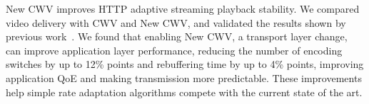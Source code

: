\documentclass[10pt,sigconf]{acmart}
\begin{document}
New CWV improves HTTP adaptive streaming playback stability. We compared video delivery with CWV and New CWV, and validated the results shown by previous work~\cite{Nazir-2014-performance-evaluation-congestion-window-validation-dash-newcwv}. We found that enabling New CWV, a transport layer change, can improve application layer performance, reducing the number of encoding switches by up to 12\% points and rebuffering time by up to 4\% points, improving application QoE and making transmission more predictable. These improvements help simple rate adaptation algorithms compete with the current state of the art.  








\ifpdf
  \ifdefined\pdftrailerid
    \pdftrailerid{}
  \fi
\fi


\end{document}
